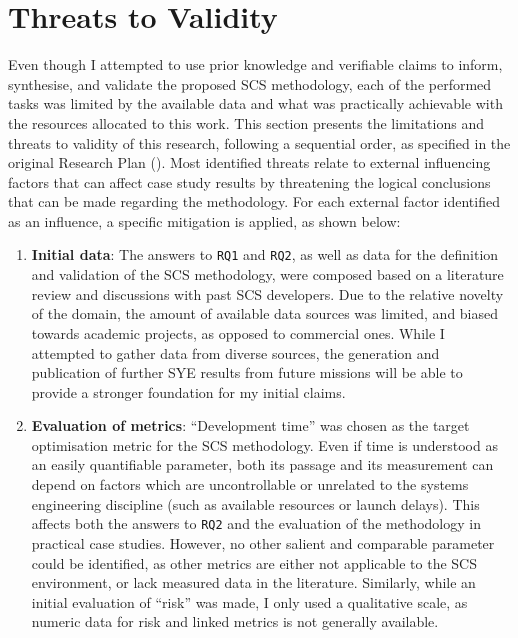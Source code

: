 \documentclass[a4paper,nobib,justified,final]{tufte-book}
\begin{document}
\FloatBarrier
\section{Threats to Validity}
\label{sec:DISCUSSION_limitations}
\begin{fullwidth}
	Even though I attempted to use prior knowledge and verifiable claims to inform, synthesise, and validate the proposed \acs{SCS} methodology, each of the performed tasks was limited by the available data and what was practically achievable with the resources allocated to this work.
	This section presents the limitations and threats to validity of this research, following a sequential order, as specified in the original Research Plan (). %
	Most identified threats relate to external influencing factors that can affect case study results by threatening the logical conclusions that can be made regarding the methodology. For each external factor identified as an influence, a specific mitigation is applied, as shown below:


\begin{enumerate}
	\item[Threat 1.] \textbf{Initial data}: The answers to \texttt{RQ1} and \texttt{RQ2}, as well as data for the definition and validation of the \acs{SCS} methodology, were composed based on a literature review and discussions with past \acs{SCS} developers. Due to the relative novelty of the domain, the amount of available data sources was limited, and biased towards academic projects, as opposed to commercial ones. While I attempted to gather data from diverse sources, the generation and publication of further \acl{SYE} results from future missions will be able to provide a stronger foundation for my initial claims.

	\item[Threat 2.] \textbf{Evaluation of metrics}: ``Development time'' was chosen as the target optimisation metric for the \acs{SCS} methodology. Even if time is understood as an easily quantifiable parameter, both its passage and its measurement can depend on factors which are uncontrollable or unrelated to the systems engineering discipline (such as available resources or launch delays).
	This affects both the answers to \texttt{RQ2} and the evaluation of the methodology in practical case studies. However, no other salient and comparable parameter could be identified, as other metrics are either not applicable to the \acs{SCS} environment, or lack measured data in the literature. Similarly, while an initial evaluation of ``risk'' was made, I only used a qualitative scale, as numeric data for risk and linked metrics is not generally available.


\end{enumerate}
\end{fullwidth}
\end{document}
